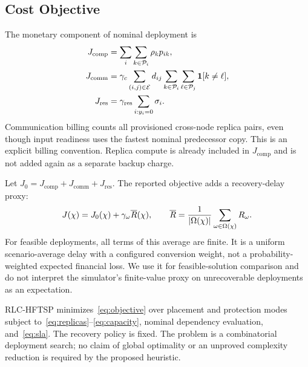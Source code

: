 \subsection{Cost Objective}
The monetary component of nominal deployment is
\begin{align}
 J_{\mathrm{comp}}&=\sum_i\sum_{k\in\mathcal{P}_{i}}\rho_kp_{ik},\\
 J_{\mathrm{comm}}&=\gamma_c\sum_{(i,j)\in\mathcal{E}}d_{ij}
      \sum_{k\in\mathcal{P}_{i}}\sum_{\ell\in\mathcal{P}_{j}}\mathbf1[k\ne\ell],\\
 J_{\mathrm{res}}&=\gamma_{\mathrm{res}}\sum_{i:y_i=0}\sigma_i.
 \label{eq:cost_terms}
\end{align}
Communication billing counts all provisioned cross-node replica pairs, even
though input readiness uses the fastest nominal predecessor copy. This is an
explicit billing convention. Replica compute is already included in
$J_{\mathrm{comp}}$ and is not added again as a separate backup charge.

Let $J_0=J_{\mathrm{comp}}+J_{\mathrm{comm}}+J_{\mathrm{res}}$. The reported
objective adds a recovery-delay proxy:
\begin{equation}
 J(\chi)=J_0(\chi)+\gamma_{\omega}\overline R(\chi),\qquad
 \overline R=\frac{1}{|\Omega(\chi)|}\sum_{\omega\in\Omega(\chi)}R_{\omega}.
 \label{eq:objective}
\end{equation}
For feasible deployments, all terms of this average are finite. It is a
uniform scenario-average delay with a configured conversion weight, not a
probability-weighted expected financial loss. We use it for feasible-solution
comparison and do not interpret the simulator's finite-value proxy on
unrecoverable deployments as an expectation.

RLC-HFTSP minimizes~\eqref{eq:objective} over placement and protection modes
subject to~\eqref{eq:replicas}--\eqref{eq:capacity}, nominal dependency
evaluation, and~\eqref{eq:sla}. The recovery policy is fixed. The problem is
a combinatorial deployment search; no claim of global optimality or an
unproved complexity reduction is required by the proposed heuristic.
